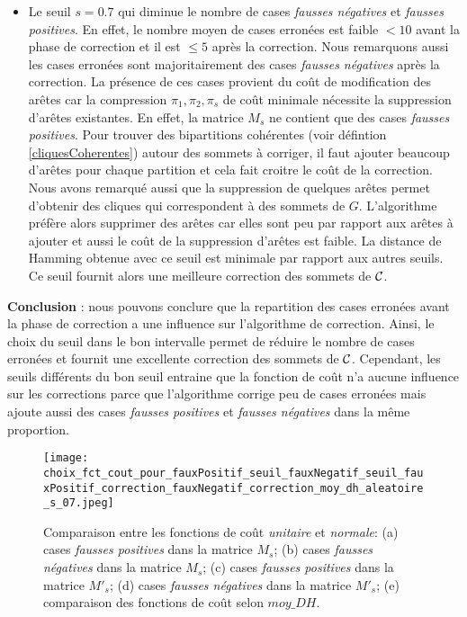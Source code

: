 \begin{itemize}
	\item Le seuil $s=0.7$ qui diminue le nombre de cases {\em fausses n\'egatives} et {\em fausses positives}. En effet, le nombre moyen de cases erron\'ees est faible $< 10$ avant la phase de correction et il est $ \le 5$ apr\`es la correction. 
	Nous remarquons aussi les cases erron\'ees sont majoritairement des cases {\em fausses n\'egatives} apr\`es la correction.
	La pr\'esence de ces cases provient du co\^ut de modification des ar\^etes car la compression $\pi_1,\pi_2, \pi_s$ de co\^ut minimale n\'ecessite la suppression d'ar\^etes existantes.
	En effet, la matrice $M_s$ ne contient que des cases {\em fausses positives}. Pour trouver des bipartitions coh\'erentes (voir d\'efintion \ref{cliquesCoherentes}) autour des sommets \`a corriger, il faut ajouter beaucoup d'ar\^etes pour chaque partition et cela fait croitre le co\^ut de la correction. 
	Nous avons remarqu\'e aussi que la suppression de quelques ar\^etes permet d'obtenir des cliques qui correspondent \`a des sommets de $G$. L'algorithme pr\'ef\`ere alors supprimer des ar\^etes car elles sont peu par rapport aux ar\^etes \`a ajouter et aussi le co\^ut de la suppression d'ar\^etes est faible.
	 La distance de Hamming obtenue avec ce seuil est minimale par rapport aux autres seuils. Ce seuil fournit alors une meilleure correction des sommets de ${\cal C}$. 
	
\end{itemize}

{\bf Conclusion} : 
nous pouvons conclure que la repartition des cases erron\'ees avant la phase de correction a une influence sur l'algorithme de correction. 
Ainsi, le choix du seuil dans le bon intervalle permet de r\'eduire le nombre de cases erron\'ees et fournit une excellente correction des sommets de ${\cal C}$. 
Cependant,  les seuils diff\'erents du bon seuil  entraine que la fonction de co\^ut n'a aucune influence sur les corrections parce que l'algorithme corrige peu de cases erron\'ees mais ajoute aussi des cases {\em fausses positives} et {\em fausses n\'egatives} dans la m\^eme proportion. 

\begin{figure}[htb!] 
\centering
\texttt{[image: choix\_fct\_cout\_pour\_fauxPositif\_seuil\_fauxNegatif\_seuil\_fauxPositif\_correction\_fauxNegatif\_correction\_moy\_dh\_aleatoire\_s\_07.jpeg]}
\caption{ Comparaison entre les fonctions de co\^ut {\em unitaire} et {\em normale}: (a) cases {\em fausses positives} dans la matrice $M_s$; (b) cases {\em fausses n\'egatives} dans la matrice $M_s$; (c) cases {\em fausses positives} dans la matrice $M'_s$; (d) cases {\em fausses n\'egatives} dans la matrice $M'_s$; (e) comparaison des fonctions de co\^ut selon $moy\_DH$.}
\label{comparaisonFctCoutUnitaireNormale} 
\end{figure}
 \FloatBarrier

